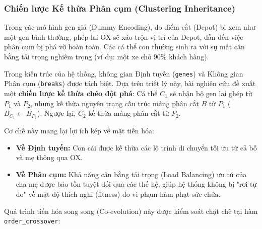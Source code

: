 \documentclass[12pt,a4paper]{article}
\numberwithin{figure}{subsection}
\begin{document}
\subsubsection{Chiến lược Kế thừa Phân cụm (Clustering Inheritance)}

Trong các mô hình gen giả (Dummy Encoding), do điểm cắt (Depot) bị xem như một gen bình thường, phép lai OX sẽ xáo trộn vị trí của Depot, dẫn đến việc phân cụm bị phá vỡ hoàn toàn. Các cá thể con thường sinh ra với sự mất cân bằng tải trọng nghiêm trọng (ví dụ: một xe chở $90\%$ khách hàng).

Trong kiến trúc của hệ thống, không gian Định tuyến (\texttt{genes}) và Không gian Phân cụm (\texttt{breaks}) được tách biệt. Dựa trên triết lý này, bài nghiên cứu đề xuất một \textbf{chiến lược kế thừa chéo đột phá}: Cá thể $C_1$ sẽ nhận bộ gen lai ghép từ $P_1$ và $P_2$, nhưng kế thừa nguyên trạng cấu trúc mảng phân cắt $B$ từ $P_1$ ($B_{C_1} \gets B_{P_1}$). Ngược lại, $C_2$ kế thừa mảng phân cắt từ $P_2$.

Cơ chế này mang lại lợi ích kép về mặt tiến hóa: 
\begin{itemize}[label={ $\circ$}, leftmargin=1.5cm]
    \item \textbf{Về Định tuyến:} Con cái được kế thừa các lộ trình di chuyển tối ưu từ cả bố và mẹ thông qua OX.
    \item \textbf{Về Phân cụm:} Khả năng cân bằng tải trọng (Load Balancing) ưu tú của cha mẹ được bảo tồn tuyệt đối qua các thế hệ, giúp hệ thống không bị "rơi tự do" về mặt độ thích nghi (fitness) do vi phạm hàm phạt sức chứa.
\end{itemize}

\noindent Quá trình tiến hóa song song (Co-evolution) này được kiểm soát chặt chẽ tại hàm \texttt{order\_crossover}:
\end{document}
